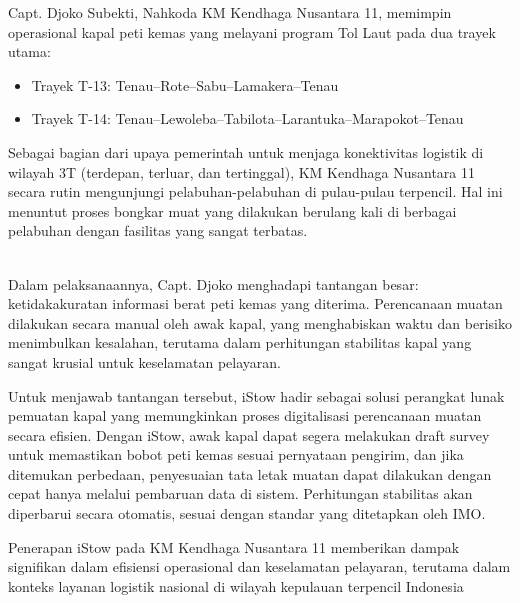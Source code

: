 Capt. Djoko Subekti, Nahkoda KM Kendhaga Nusantara 11, memimpin operasional kapal peti kemas yang melayani program Tol Laut pada dua trayek utama:
\begin{itemize}
    \item Trayek T-13: Tenau--Rote--Sabu--Lamakera--Tenau
    \item Trayek T-14: Tenau--Lewoleba--Tabilota--Larantuka--Marapokot--Tenau
\end{itemize}


Sebagai bagian dari upaya pemerintah untuk menjaga konektivitas logistik di wilayah 3T (terdepan, terluar, dan tertinggal), KM Kendhaga Nusantara 11 secara rutin mengunjungi pelabuhan-pelabuhan di pulau-pulau terpencil. Hal ini menuntut proses bongkar muat yang dilakukan berulang kali di berbagai pelabuhan dengan fasilitas yang sangat terbatas.\\

{
\\
}

Dalam pelaksanaannya, Capt. Djoko menghadapi tantangan besar: ketidakakuratan informasi berat peti kemas yang diterima. Perencanaan muatan dilakukan secara manual oleh awak kapal, yang menghabiskan waktu dan berisiko menimbulkan kesalahan, terutama dalam perhitungan stabilitas kapal yang sangat krusial untuk keselamatan pelayaran.

Untuk menjawab tantangan tersebut, iStow hadir sebagai solusi perangkat lunak pemuatan kapal yang memungkinkan proses digitalisasi perencanaan muatan secara efisien. Dengan iStow, awak kapal dapat segera melakukan draft survey untuk memastikan bobot peti kemas sesuai pernyataan pengirim, dan jika ditemukan perbedaan, penyesuaian tata letak muatan dapat dilakukan dengan cepat hanya melalui pembaruan data di sistem. Perhitungan stabilitas akan diperbarui secara otomatis, sesuai dengan standar yang ditetapkan oleh IMO.

Penerapan iStow pada KM Kendhaga Nusantara 11 memberikan dampak signifikan dalam efisiensi operasional dan keselamatan pelayaran, terutama dalam konteks layanan logistik nasional di wilayah kepulauan terpencil Indonesia

